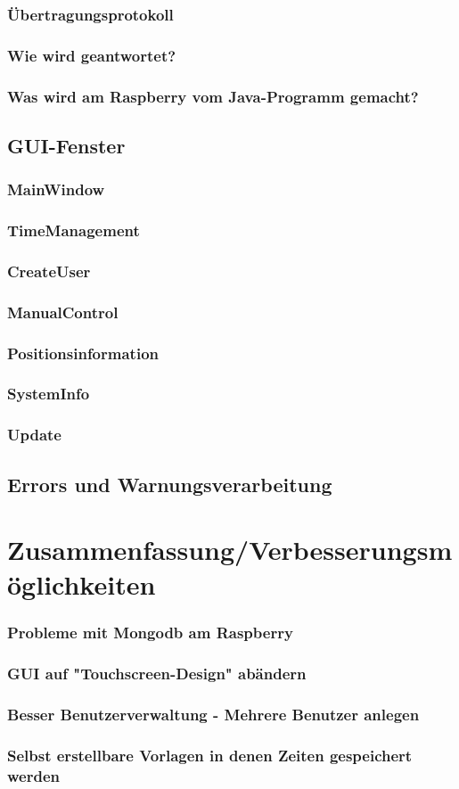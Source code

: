 \subsubsection{Übertragungsprotokoll}
\subsubsection{Wie wird geantwortet?}
\subsubsection{Was wird am Raspberry vom Java-Programm gemacht?}
\subsection{GUI-Fenster}
\subsubsection{MainWindow}
\subsubsection{TimeManagement}
\subsubsection{CreateUser}
\subsubsection{ManualControl}
\subsubsection{Positionsinformation}
\subsubsection{SystemInfo}
\subsubsection{Update}
\subsection{Errors und Warnungsverarbeitung}

\section{Zusammenfassung/Verbesserungsmöglichkeiten}
\subsubsection{Probleme mit Mongodb am Raspberry}
\subsubsection{GUI auf "Touchscreen-Design" abändern}
\subsubsection{Besser Benutzerverwaltung - Mehrere Benutzer anlegen}
\subsubsection{Selbst erstellbare Vorlagen in denen Zeiten gespeichert werden}

